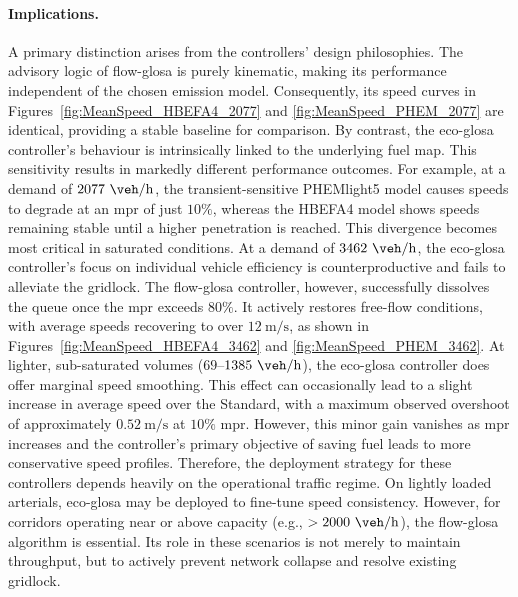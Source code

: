 \paragraph{Implications.}
A primary distinction arises from the controllers' design philosophies. The advisory logic of \ac{flow-glosa} is purely kinematic, making its performance independent of the chosen emission model. Consequently, its speed curves in Figures~\vref{fig:MeanSpeed_HBEFA4_2077} and \vref{fig:MeanSpeed_PHEM_2077} are identical, providing a stable baseline for comparison. By contrast, the \ac{eco-glosa} controller's behaviour is intrinsically linked to the underlying fuel map. This sensitivity results in markedly different performance outcomes. For example, at a demand of $2077~\unit{\veh\per\hour}$, the transient-sensitive PHEMlight5 model causes speeds to degrade at an \ac{mpr} of just $10\%$, whereas the HBEFA4 model shows speeds remaining stable until a higher penetration is reached.
This divergence becomes most critical in saturated conditions. At a demand of $3462~\unit{\veh\per\hour}$, the \ac{eco-glosa} controller's focus on individual vehicle efficiency is counterproductive and fails to alleviate the gridlock. The \ac{flow-glosa} controller, however, successfully dissolves the queue once the \ac{mpr} exceeds $80\%$. It actively restores free-flow conditions, with average speeds recovering to over $12~\unit{\metre\per\second}$, as shown in Figures~\vref{fig:MeanSpeed_HBEFA4_3462} and \vref{fig:MeanSpeed_PHEM_3462}.
At lighter, sub-saturated volumes ($69$--$1385~\unit{\veh\per\hour}$), the \ac{eco-glosa} controller does offer marginal speed smoothing. This effect can occasionally lead to a slight increase in average speed over the Standard, with a maximum observed overshoot of approximately $0.52~\unit{\metre\per\second}$ at $10\%$ \ac{mpr}. However, this minor gain vanishes as \ac{mpr} increases and the controller's primary objective of saving fuel leads to more conservative speed profiles. Therefore, the deployment strategy for these controllers depends heavily on the operational traffic regime. On lightly loaded arterials, \ac{eco-glosa} may be deployed to fine-tune speed consistency. However, for corridors operating near or above capacity (e.g., $> 2000~\unit{\veh\per\hour}$), the \ac{flow-glosa} algorithm is essential. Its role in these scenarios is not merely to maintain throughput, but to actively prevent network collapse and resolve existing gridlock.

